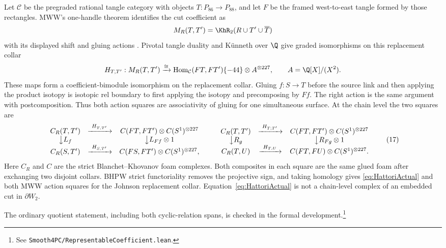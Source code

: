 Let $\mathcal C$ be the pregraded rational tangle category with objects
$T:P_{86}\to P_{88}$, and let $F$ be the framed west-to-east tangle formed
by those rectangles.  MWW's one-handle theorem identifies the cut coefficient
as
\[
M_R(T,T')=\KhR_2(R\cup T'\cup\overline T)
\]
with its displayed shift and gluing actions
\cite[Theorem~4.7]{ManolescuWalkerWedrich2023}.  Pivotal tangle duality and
K\"unneth over $\Q$ give graded isomorphisms on this replacement collar
\begin{equation}\label{eq:HattoriActual}
H_{T,T'}:M_R(T,T')\xrightarrow{\cong}
\operatorname{Hom}_{\mathcal C}(FT,FT')\{-44\}
\otimes A^{\otimes227},
\qquad A=\Q[X]/(X^2).
\end{equation}
These maps form a coefficient-bimodule isomorphism on the replacement collar.
Gluing $f:S\to T$ before the source link and then applying the product
isotopy is isotopic rel boundary to first applying the isotopy and
precomposing by $Ff$.  The right action is the same argument with
postcomposition.  Thus both action squares are associativity of gluing for
one simultaneous surface.  At the chain level the two squares are
\[
\begin{array}{ccc}
C_R(T,T')&\xrightarrow{\ H_{T,T'}\ }&
C(FT,FT')\otimes C(S^1)^{\otimes227}\\
\big\downarrow {L_f}&&\big\downarrow {L_{Ff}\otimes1}\\
C_R(S,T')&\xrightarrow{\ H_{S,T'}\ }&
C(FS,FT')\otimes C(S^1)^{\otimes227},
\end{array}
\qquad
\begin{array}{ccc}
C_R(T,T')&\xrightarrow{\ H_{T,T'}\ }&
C(FT,FT')\otimes C(S^1)^{\otimes227}\\
\big\downarrow {R_g}&&\big\downarrow {R_{Fg}\otimes1}\\
C_R(T,U)&\xrightarrow{\ H_{T,U}\ }&
C(FT,FU)\otimes C(S^1)^{\otimes227}.
\end{array}
\tag{17}
\]
Here $C_R$ and $C$ are the strict Blanchet--Khovanov foam complexes.  Both
composites in each square are the same glued foam after exchanging two
disjoint collars.  BHPW strict functoriality removes the projective sign, and
taking homology gives \eqref{eq:HattoriActual} and both MWW action squares
for the Johnson replacement collar.  Equation~\eqref{eq:HattoriActual} is
not a chain-level complex of an embedded cut in $\partial W_2$.

The ordinary quotient statement, including both cyclic-relation spans, is
checked in the formal development.\footnote{See
\texttt{Smooth4PC/RepresentableCoefficient.lean}.}

